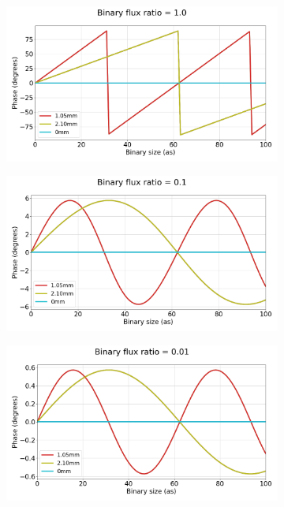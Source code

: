 \begin{figure}[ht!]
    \centering
    \begin{subfigure}{0.5\textwidth}
        \centering
        \includegraphics[width=\textwidth]{Figure_Chap4/SpectralDiffPhase_VS_BinSize_FR1e0_37_7_26_15_28.png}
        \caption{}
        \label{fig:PhaseDiffBinSizeSimuleA}
    \end{subfigure}
    \begin{subfigure}{0.5\textwidth}
        \centering
        \includegraphics[width=\textwidth]{Figure_Chap4/SpectralDiffPhase_VS_BinSize_FR1e-1_37_7_26_15_28.png}
        \caption{}
        \label{fig:PhaseDiffBinSizeSimuleB}
    \end{subfigure}%
    \begin{subfigure}{0.5\textwidth}
        \centering
        \includegraphics[width=\textwidth]{Figure_Chap4/SpectralDiffPhase_VS_BinSize_FR1e-2_37_7_26_15_28.png}

\end{subfigure}
\end{figure}
